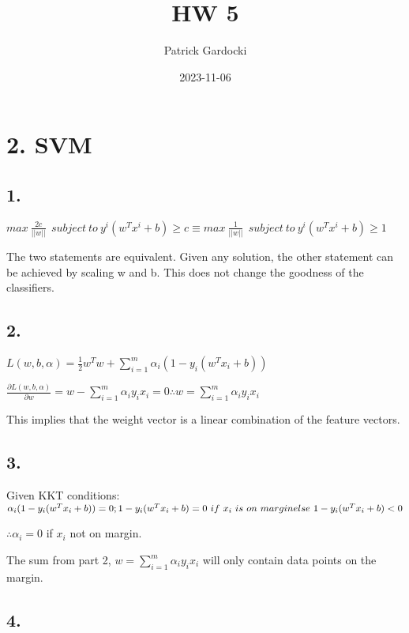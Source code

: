 \documentclass[
]{article}
\title{HW 5}
\author{Patrick Gardocki}
\date{2023-11-06}
\begin{document}
\maketitle

\hypertarget{svm}{%
\section{2. SVM}\label{svm}}

\hypertarget{section}{%
\subsection{1.}\label{section}}

\(max \ \frac{2c}{||w||} \ \ subject \  to \ y^i(w^Tx^i+b)\ge c \equiv max \ \frac{1}{||w||} \ \ subject \  to \ y^i(w^Tx^i+b)\ge 1\)

The two statements are equivalent. Given any solution, the other
statement can be achieved by scaling w and b. This does not change the
goodness of the classifiers.

\hypertarget{section-1}{%
\subsection{2.}\label{section-1}}

\(L(w,b,\alpha)=\frac{1}{2}w^Tw+\sum_{i=1}^m\alpha_i(1-y_i(w^Tx_i+b))\)

\(\frac{\partial L(w,b,\alpha)}{\partial w}= w-\sum_{i=1}^m\alpha_iy_ix_i=0 \therefore w =\sum_{i=1}^m\alpha_iy_ix_i\)

This implies that the weight vector is a linear combination of the
feature vectors.

\hypertarget{section-2}{%
\subsection{3.}\label{section-2}}

Given KKT conditions:
\(\alpha_i(1-y_i(w^Tx_i+b))=0; \\ 1-y_i(w^Tx_i+b) = 0 \ if \ x_i \ is \ on \ margin \\ else \  1-y_i(w^Tx_i+b) < 0\)

\(\therefore \alpha_i=0\) if \(x_i\) not on margin.

The sum from part 2, \(w =\sum_{i=1}^m\alpha_iy_ix_i\) will only contain
data points on the margin.

\hypertarget{section-3}{%
\subsection{4.}\label{section-3}}
\end{document}
